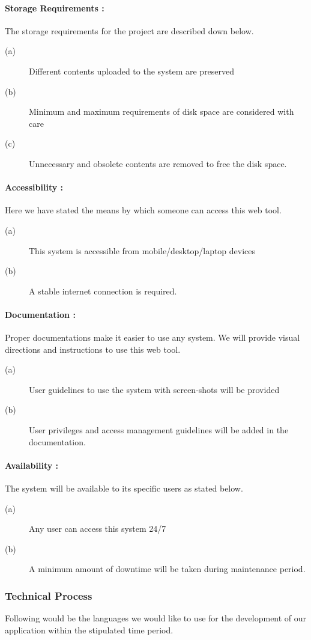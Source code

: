 \paragraph{Storage Requirements :}
The storage requirements for the project are described down below.
\begin{description}
\item[(a)] Different contents uploaded to the system are preserved
\item[(b)] Minimum and maximum requirements of disk space are considered with care
\item[(c)] Unnecessary and obsolete contents are removed to free the disk space.
\end{description}
\paragraph{Accessibility :}
Here we have stated the means by which someone can access this web tool.
\begin{description}
\item[(a)] This system is accessible from mobile/desktop/laptop devices
\item[(b)] A stable internet connection is required.
\end{description}
\paragraph{Documentation :}
Proper documentations make it easier to use any system. We will provide visual directions and instructions to use this web tool.
\begin{description}
\item[(a)] User guidelines to use the system with screen-shots will be provided
\item[(b)] User privileges and access management guidelines will be added in the documentation.
\end{description}
\paragraph{Availability :}
The system will be available to its specific users as stated below.
\begin{description}
\item[(a)] Any user can access this system 24/7
\item[(b)] A minimum amount of downtime will be taken during maintenance period.
\end{description}
\subsubsection{Technical Process}
Following would be the languages we would like to use for the development of our application within the stipulated time period.
